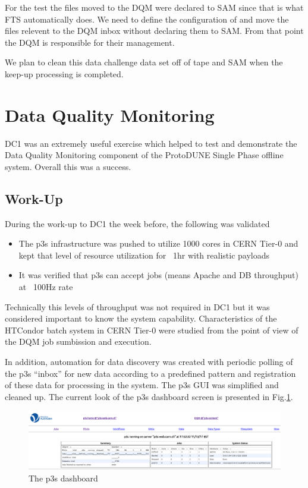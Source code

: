 \documentclass[pdftex,12pt,letter]{article}
\begin{document}
For the test the files moved to the DQM were declared to SAM since that is what FTS automatically does. We need to define the configuration of and move the files relevent to the DQM inbox without declaring them to SAM. From that point the DQM is responsible for their management.

We plan to clean this data challenge data set off of tape and SAM when the keep-up processing is completed.


\section {Data Quality Monitoring}
DC1 was an extremely useful exercise which helped to test and demonstrate the Data Quality Monitoring component
of the ProtoDUNE Single Phase offline system. Overall this was a success.

\subsection{Work-Up}

During the work-up to DC1 the week before, the following was validated
\begin{itemize}

\item The p3s infrastructure was pushed to utilize 1000 cores in CERN Tier-0 and kept that level of resource utilization for ~1hr
with realistic payloads
\item It was verified that p3s can accept jobs (means Apache and DB throughput) at ~100Hz rate

\end{itemize}
\noindent Technically this levels of throughput was not required in DC1 but it was considered important to know the system capability.
Characteristics of the HTCondor batch system in CERN Tier-0 were studied from the point of view of the DQM job sumbission and
execution.

In addition, automation for data discovery was created with periodic polling of the p3s ``inbox'' for new data according to a predefined pattern
and registration of these data for processing in the system. The p3s GUI was simplified and cleaned up. The current look of the p3s
dashboard screen is presented in Fig.\ref{fig:p3s_dash}.
\begin{figure}[tbh]
  \centering
  \includegraphics[width=1.0\textwidth]{./ReportImages/p3s_20171113_1.png}
  \caption{The p3s dashboard}
  \label{fig:p3s_dash}
\end{figure}
\end{document}
